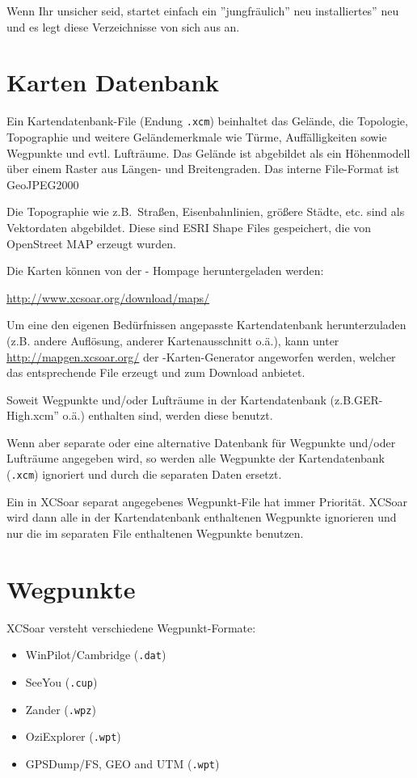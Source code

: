 Wenn Ihr unsicher seid, startet einfach ein ''jungfräulich'' neu installiertes'' \xc neu und es legt diese
Verzeichnisse von sich aus an.


\section{Karten Datenbank}\label{sec:map}

Ein Kartendatenbank-File (Endung \verb|.xcm|) beinhaltet das Gelände, die Topologie, Topographie und
weitere Geländemerkmale wie Türme, Auffälligkeiten sowie Wegpunkte und evtl. Lufträume.  Das
Gelände ist abgebildet als ein Höhenmodell über einem Raster aus Längen- und Breitengraden. Das interne
File-Format ist GeoJPEG2000

Die Topographie wie z.B.\ Straßen, Eisenbahnlinien, größere Städte, etc. sind als Vektordaten abgebildet.
Diese sind ESRI Shape Files gespeichert, die von OpenStreet MAP erzeugt wurden.

Die Karten können von der  \xc - Hompage heruntergeladen werden:

\url{http://www.xcsoar.org/download/maps/}

Um eine den eigenen Bedürfnissen angepasste Kartendatenbank herunterzuladen (z.B. andere Auflösung,
anderer Kartenausschnitt o.ä.), kann unter \url{http://mapgen.xcsoar.org/}  der \xc-Karten-Generator
angeworfen werden, welcher das entsprechende File erzeugt und zum Download
anbietet.

Soweit Wegpunkte und/oder Lufträume in der Kartendatenbank (z.B.\verb''GER-High.xcm'' o.ä.) enthalten sind,
werden diese benutzt.

Wenn aber separate oder eine alternative Datenbank für Wegpunkte und/oder Lufträume angegeben
wird, so werden alle Wegpunkte der Kartendatenbank (\verb".xcm") ignoriert und durch die separaten
Daten ersetzt.

Ein in \textsf{XCSoar} separat angegebenes Wegpunkt-File hat immer Priorität. \textsf{XCSoar} wird dann alle in der Kartendatenbank enthaltenen Wegpunkte ignorieren und nur die im separaten File enthaltenen Wegpunkte benutzen.


\section{Wegpunkte}
 \textsf{XCSoar} versteht verschiedene Wegpunkt-Formate:

\begin{itemize}
\item WinPilot/Cambridge (\verb|.dat|)
\item SeeYou (\verb|.cup|)
\item Zander (\verb|.wpz|)
\item OziExplorer (\verb|.wpt|)
\item GPSDump/FS, GEO and UTM (\verb|.wpt|)
\end{itemize}


